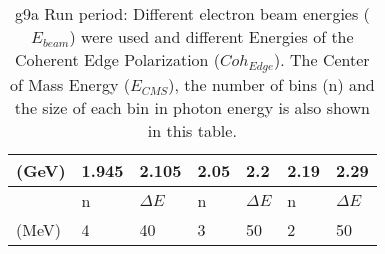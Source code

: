 \begin{table}[h]
\begin{center}
\begin{tabular}{ |l||l|l||l|l||l|l||l|l||}
      \multicolumn{3}{|l||}{(GeV)} & 1.945 & 2.105 & 2.05 & 2.2 & 2.19 & 2.29 \\
      \hline
      \multicolumn{3}{|l||}{} & n  &  $\Delta E$ & n  &  $\Delta E$ & n  &  $\Delta E$ \\
      \multicolumn{3}{|l||}{(MeV)} & 4 & 40 & 3 & 50 & 2 & 50  \\
      \hline
    \end{tabular}
  \end{center}
  \caption{g9a Run period: Different electron beam energies ($E_{beam}$) were used and  different Energies of the Coherent Edge Polarization ($Coh_{Edge}$). The Center of Mass Energy ($E_{CMS}$), the number of bins (n) and the size of each bin in photon energy is also shown in this table.}
  \label{table:g9a_conf_color}
\end{table}


